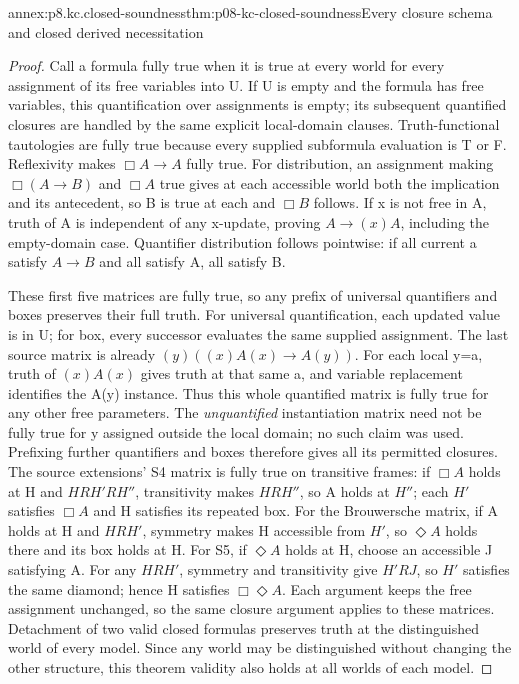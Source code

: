 \begin{annexitem}{annex:p8.kc.closed-soundness}{thm:p08-kc-closed-soundness}{Every closure schema and closed derived necessitation}
\begin{proof}
Call a formula fully true when it is true at every world for
every assignment of its free variables into U. If U is empty
and the formula has free variables, this quantification over
assignments is empty; its subsequent quantified closures are
handled by the same explicit local-domain clauses.
Truth-functional tautologies are fully true because every
supplied subformula evaluation is T or F. Reflexivity makes
\(\Box A\to A\) fully true. For distribution, an assignment
making \(\Box(A\to B)\) and \(\Box A\) true gives at
each accessible world both the implication and its antecedent,
so B is true at each and \(\Box B\) follows. If x is not
free in A, truth of A is independent of any x-update, proving
\(A\to(x)A\), including the empty-domain case. Quantifier
distribution follows pointwise: if all current a satisfy
\(A\to B\) and all satisfy A, all satisfy B.

These first five matrices are fully true, so any prefix of
universal quantifiers and boxes preserves their full truth.
For universal quantification, each updated value is in U;
for box, every successor evaluates the same supplied assignment.
The last source matrix is already \((y)((x)A(x)\to A(y))\).
For each local y=a, truth of \((x)A(x)\) gives truth at that
same a, and variable replacement identifies the A(y) instance.
Thus this whole quantified matrix is fully true for any other
free parameters. The \emph{unquantified} instantiation matrix
need not be fully true for y assigned outside the local domain;
no such claim was used. Prefixing further quantifiers and boxes
therefore gives all its permitted closures. The source extensions'
S4 matrix is fully true on transitive frames: if \(\Box A\)
holds at H and \(HRH'RH''\), transitivity makes \(HRH''\),
so A holds at \(H''\); each \(H'\) satisfies \(\Box A\)
and H satisfies its repeated box. For the Brouwersche matrix,
if A holds at H and \(HRH'\), symmetry makes H accessible
from \(H'\), so \(\Diamond A\) holds there and its box
holds at H. For S5, if \(\Diamond A\) holds at H, choose
an accessible J satisfying A. For any \(HRH'\), symmetry
and transitivity give \(H'RJ\), so \(H'\) satisfies the
same diamond; hence H satisfies \(\Box\Diamond A\).
Each argument keeps the free assignment unchanged, so the
same closure argument applies to these matrices.
Detachment of two valid closed formulas preserves truth
at the distinguished world of every model. Since any world may
be distinguished without changing the other structure, this
theorem validity also holds at all worlds of each model.


\end{proof}
\end{annexitem}
